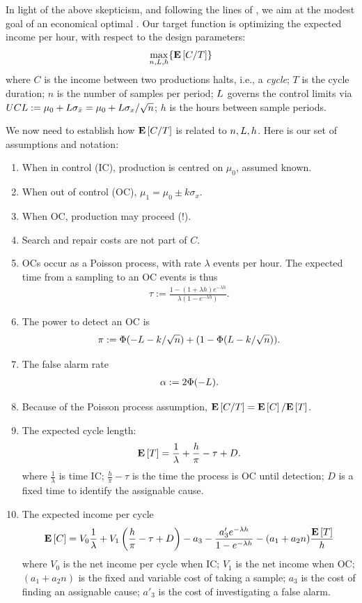 In light of the above skepticism, and following the lines of \cite{duncan_economic_1956}, we aim at the modest goal of an economical optimal \barxChart. 
Our target function is optimizing the expected income per hour, with respect to the design parameters:
\begin{align}
\label{eq:optimal_design}
	\max_{n,L,h}\{ \mathbf{E}\left[ C/T \right] \}
\end{align}
where $C$ is the income between two productions halts, i.e., a \emph{cycle};
$T$ is the cycle duration;
$n$ is the number of samples per period;
$L$ governs the control limits via $UCL:= \mu_0+ L \sigma_{\bar{x}}= \mu_0+ L \sigma_x / \sqrt{n}$;
$h$ is the hours between sample periods. 

We now need to establish how $\mathbf{E}\left[ C/T \right]$ is related to $n,L,h$. Here is our set of assumptions and notation:
\begin{enumerate}
\item When in control (IC), production is centred on $\mu_0$, assumed known. 
\item When out of control (OC), $\mu_1=\mu_0 \pm k \sigma_x$. 
\item When OC, production may proceed (!). 
\item Search and repair costs are not part of $C$.
\item OCs occur as a Poisson process, with rate $\lambda$ events per hour. The expected time from a sampling to an OC events is thus 
\begin{align}
	\tau := \frac{1-(1+ \lambda h) e^{-\lambda h}}{\lambda(1-e^{-\lambda h})}.
\end{align} 
\item The power to detect an OC is 
\begin{align}
	\pi:= \Phi(-L-k/\sqrt{n})+ (1-\Phi(L-k/\sqrt{n})).
\end{align}
\item The false alarm rate
\begin{align}
	\alpha:= 2 \Phi(-L).
\end{align}
\item Because of the Poisson process assumption,  $\mathbf{E}\left[ C/T \right]=\mathbf{E}\left[ C \right]/\mathbf{E}\left[ T \right]$. 
\item The expected cycle length:
\begin{align}
	\mathbf{E}\left[ T \right]= \frac{1}{\lambda}+ \frac{h}{\pi}- \tau  + D.
\end{align}
where $\frac{1}{\lambda}$ is time IC;
$\frac{h}{\pi}- \tau$ is the time the process is OC until detection;
$D$ is a fixed time to identify the assignable cause. 
\item The expected income per cycle
\begin{align*}
	\mathbf{E}\left[ C \right]= V_0 \frac{1}{\lambda} + 
	V_1 \left(\frac{h}{\pi}- \tau  + D  \right) - 
	a_3 -
	\frac{a'_3 e^{-\lambda h}}{1-e^{-\lambda h}} -
	(a_1+a_2n)\frac{\mathbf{E}\left[ T \right]}{h}
\end{align*}
where $V_0$ is the net income per cycle when IC;
$V_1$ is the net income when OC;
$(a_1+a_2n)$ is the fixed and variable cost of taking a sample;
$a_3$ is the cost of finding an assignable cause;
$a'_3$ is the cost of investigating a false alarm.
\end{enumerate}

